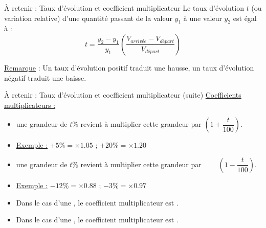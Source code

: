 \documentclass[xcolor={dvipsnames}]{beamer}
\begin{document}
\begin{frame}

	\begin{alertblock}{\`A retenir : Taux d'évolution et coefficient multiplicateur}
		Le taux d'évolution $t$ (ou variation relative) d'une quantité passant de la valeur $y_1$ à une valeur $y_2$ est égal à :
		\begin{equation*}
		t = \dfrac{y_2 - y_1}{y_1} \left(\dfrac{V_{arrivée} - V_{départ}}{V_{départ}}\right)
		\end{equation*}
		
		\underline{Remarque} : Un taux d'évolution positif traduit une hausse, un taux d'évolution négatif traduit une baisse.\\
		
		
		
		
	\end{alertblock}

\end{frame}

\begin{frame}

\begin{alertblock}{\`A retenir : Taux d'évolution et coefficient multiplicateur (suite)}
	\underline{Coefficients multiplicateurs :} 
	\begin{itemize}

		\item {} une grandeur de $t \%$ revient à multiplier cette grandeur par $\left(1 + \dfrac{t}{100}\right)$.
		
		\item \underline{Exemple :} $+ 5 \% = \times \num{1.05}$ ; $+ 20 \% = \times \num{1.20}$ \\
		
		\item {} une grandeur de $t \%$ revient à multiplier cette grandeur par $\qquad \left(1 - \dfrac{t}{100}\right)$.
		\item \underline{Exemple :} $- 12 \% = \times \num{0.88}$ ; $- 3 \% = \times \num{0.97}$ \\
		
		\item Dans le cas d'une , le coefficient multiplicateur est .
		
		\item Dans le cas d'une , le coefficient multiplicateur est .
	\end{itemize}
	
	
	
\end{alertblock}

\end{frame}
\end{document}
